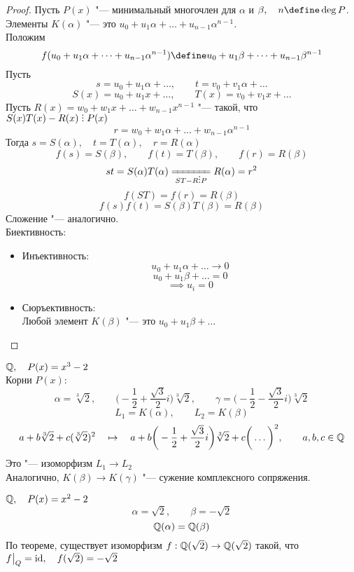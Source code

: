 \begin{proof}
	Пусть $ P(x) $ "--- минимальный многочлен для $ \alpha $ и $ \beta, \quad n \define \deg P $. \\
	Элементы $ K(\alpha) $ "--- это $ u_0 + u_1\alpha + \dots + u_{n - 1}\alpha^{n - 1} $. \\
	Положим
	$$ f(u_0 + u_1 \alpha + \dots + u_{n - 1}\alpha^{n - 1}) \define u_0 + u_1\beta + \dots + u_{n - 1}\beta^{n - 1} $$
	Пусть
	$$ s = u_0 + u_1\alpha + \dots, \qquad t = v_0 + v_1\alpha + \dots $$
	$$ S(x) = u_0 + u_1 x + \dots, \qquad T(x) = v_0 + v_1x + \dots $$
	Пусть $ R(x) = w_0 + w_1x + \dots + w_{n - 1}x^{n - 1} $ "--- такой, что $ S(x)T(x) - R(x) \divby P(x) $
	$$ r = w_0 + w_1\alpha + \dots + w_{n - 1}\alpha^{n - 1} $$
	Тогда $ s = S(\alpha), \quad t = T(\alpha), \quad r = R(\alpha) $
	$$ f(s) = S(\beta), \qquad f(t) = T(\beta), \qquad f(r) = R(\beta) $$
	$$ st = S(\alpha) T(\alpha) \undereq{ST - R \divby P} R(\alpha) = r^2 $$
	$$ f(ST) = f(r) = R(\beta) $$
	$$ f(s)f(t) = S(\beta)T(\beta) = R(\beta) $$
	Сложение "--- аналогично. \\
	Биективность:
	\begin{itemize}
		\item Инъективность:
		$$ u_0 + u_1\alpha + \dots \to 0 $$
		$$ u_0 + u_1\beta + \dots = 0 $$
		$$ \implies u_i = 0 $$
		\item Сюръективность: \\
		Любой элемент $ K(\beta) $ "--- это $ u_0 + u_1\beta + \dots $
	\end{itemize}
\end{proof}

\begin{exmpls}
	\item $ \mathbb{Q}, \quad P(x) = x^3 - 2 $ \\
	Корни $ P(x) $:
	$$ \alpha = \sqrt[3]2, \qquad \bigg( -\frac12 + \frac{\sqrt3}2i \bigg)\sqrt[3]2, \qquad \gamma = \bigg( -\frac12 - \frac{\sqrt3}2i \bigg)\sqrt[3]2 $$
	$$ L_1 = K(\alpha), \qquad L_2 = K(\beta) $$
	$$ a + b\sqrt[3]2 + c(\sqrt[3]2)^2 \quad \mapsto \quad a + b \bigg( -\frac12 + \frac{\sqrt3}2i \bigg) \sqrt[3]2 + c \bigg( \dots \bigg)^2, \qquad a, b, c \in \mathbb{Q} $$
	Это "--- изоморфизм $ L_1 \to L_2 $ \\
	Аналогично, $ K(\beta) \to K(\gamma) $ "--- сужение комплексного сопряжения.
	\item $ \mathbb{Q}, \quad P(x) = x^2 - 2 $
	$$ \alpha = \sqrt2, \qquad \beta = -\sqrt2 $$
	$$ \mathbb{Q}(\alpha) = \mathbb{Q}(\beta) $$
	По теореме, существует изоморфизм $ f : \mathbb{Q}(\sqrt2) \to \mathbb{Q}(\sqrt2) $ такой, что $ f\big|_{Q}^{} = \operatorname{id}, \quad f(\sqrt2) = -\sqrt 2 $
\end{exmpls}

